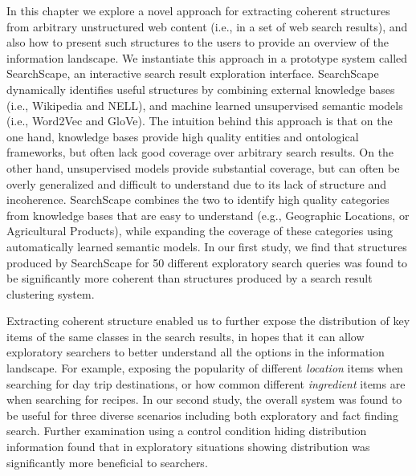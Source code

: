 

In this chapter we explore a novel approach for extracting coherent structures from arbitrary unstructured web content (i.e., in a set of web search results), and also how to present such structures to the users to provide an overview of the information landscape. We instantiate this approach in a prototype system called SearchScape, an interactive search result exploration interface. SearchScape dynamically identifies useful structures by combining external knowledge bases (i.e., Wikipedia\cite{bollacker2008freebase} and NELL\cite{carlson2010toward}), and machine learned unsupervised semantic models (i.e., Word2Vec\cite{mikolov2013efficient} and GloVe\cite{pennington2014glove}). The intuition behind this approach is that on the one hand, knowledge bases provide high quality entities and ontological frameworks, but often lack good coverage over arbitrary search results. On the other hand, unsupervised models provide substantial coverage, but can often be overly generalized and difficult to understand due to its lack of structure and incoherence. SearchScape combines the two to identify high quality categories from  knowledge bases that are easy to understand (e.g., Geographic Locations, or Agricultural Products), while expanding the coverage of these categories using automatically learned semantic models. In our first study, we find that structures produced by SearchScape for 50 different exploratory search queries was found to be significantly more coherent than structures produced by a search result clustering system.

Extracting coherent structure enabled us to further expose the distribution of key items of the same classes in the search results, in hopes that it can allow exploratory searchers to better understand all the options in the information landscape. For example, exposing the popularity of different \emph{location} items when searching for day trip destinations, or how common different \emph{ingredient} items are when searching for recipes.  In our second study, the overall system was found to be useful for three diverse scenarios including both exploratory and fact finding search. Further examination using a control condition hiding distribution information found that in exploratory situations showing distribution was significantly more beneficial to searchers.





